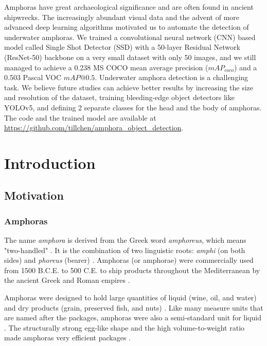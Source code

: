 \documentclass[a4paper, 11pt, oneside]{article}
\begin{document}
Amphoras have great archaeological significance and are often found in ancient shipwrecks. The increasingly abundant
visual data and the advent of more advanced deep learning algorithms motivated us to automate the detection of
underwater amphoras. We trained a convolutional neural network (CNN) based model called Single Shot Detector (SSD) with
a 50-layer Residual Network (ResNet-50) backbone on a very small dataset with only 50 images, and we still managed to
achieve a 0.238 MS COCO mean average precision ($mAP_{coco}$) and a 0.503 Pascal VOC $mAP@0.5$. Underwater amphora
detection is a challenging task. We believe future studies can achieve better results by increasing the size and
resolution of the dataset, training bleeding-edge object detectors like YOLOv5, and defining 2 separate classes for
the head and the body of amphoras. The code and the trained model are available at
\url{https://github.com/tillchen/amphora_object_detection}.

\newpage

\tableofcontents

\clearpage
{}

\section{Introduction}

\subsection{Motivation}

\subsubsection{Amphoras}

The name \textit{amphora} is derived from the Greek word \textit{amphoreus}, which means "two-handled"
\cite{harper2001online, twede2002commercial, will1977ancient}. It is the combination of two linguistic roots:
\textit{amphi} (on both sides) and \textit{phoreus} (bearer)
\cite{harper2001online, twede2002commercial, will1977ancient}. Amphoras (or amphorae) were commercially used from
1500 B.C.E. to 500 C.E. to ship products throughout the Mediterranean by the ancient Greek and Roman empires
\cite{twede2002commercial, worldhistory}.

Amphoras were designed to hold large quantities of liquid (wine, oil, and water) and dry products
(grain, preserved fish, and nuts) \cite{twede2002commercial, foley2012aspects, grace1979amphoras}. Like many measure
units that are named after the packages, amphoras were also a semi-standard unit for liquid \cite{twede2002commercial}.
The structurally strong egg-like shape and the high volume-to-weight ratio made amphoras very efficient packages
\cite{twede2002commercial, worldhistory}.
\end{document}
